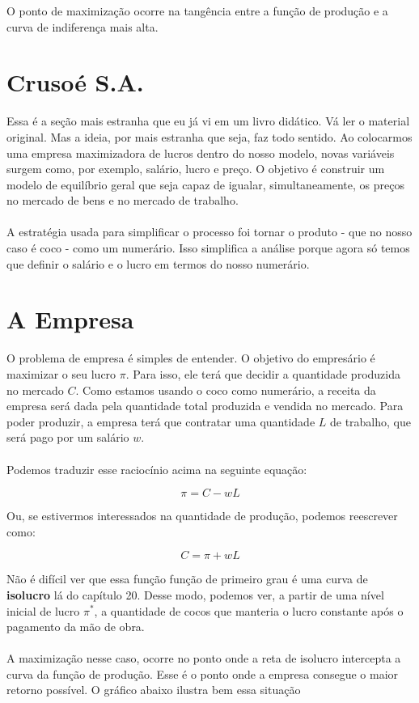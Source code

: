 \documentclass[a4paper,11pt,oneside]{book}
\theoremstyle{definition}
\theoremstyle{break}
\begin{document}
O ponto de maximização ocorre na tangência entre a função de produção e a curva de indiferença mais alta.

\section{Crusoé S.A.}

Essa é a seção mais estranha que eu já vi em um livro didático. Vá ler o material original. Mas a ideia, por mais estranha que seja, faz todo sentido. Ao colocarmos uma empresa maximizadora de lucros dentro do nosso modelo, novas variáveis surgem como, por exemplo, salário, lucro e preço. O objetivo é construir um modelo de equilíbrio geral que seja capaz de igualar, simultaneamente, os preços no mercado de bens e no mercado de trabalho.
\\~\\
A estratégia usada para simplificar o processo foi tornar o produto - que no nosso caso é coco - como um numerário. Isso simplifica a análise porque agora só temos que definir o salário e o lucro em termos do nosso numerário.

\section{A Empresa}

O problema de empresa é simples de entender. O objetivo do empresário é maximizar o seu lucro $\pi$. Para isso, ele terá que decidir a quantidade produzida no mercado $C$. Como estamos usando o coco como numerário, a receita da empresa será dada pela quantidade total produzida e vendida no mercado. Para poder produzir, a empresa terá que contratar uma quantidade $L$ de trabalho, que será pago por um salário $w$.
\\~\\
Podemos traduzir esse raciocínio acima na seguinte equação:

$$ \pi = C - wL $$

Ou, se estivermos interessados na quantidade de produção, podemos reescrever como:

$$ C = \pi + wL $$

Não é difícil ver que essa função função de primeiro grau é uma curva de \textbf{isolucro} lá do capítulo 20. Desse modo, podemos ver, a partir de uma nível inicial de lucro $\pi^*$, a quantidade de cocos que manteria o lucro constante após o pagamento da mão de obra.
\\~\\
A maximização nesse caso, ocorre no ponto onde a reta de isolucro intercepta a curva da função de produção. Esse é o ponto onde a empresa consegue o maior retorno possível. O gráfico abaixo ilustra bem essa situação
\end{document}
